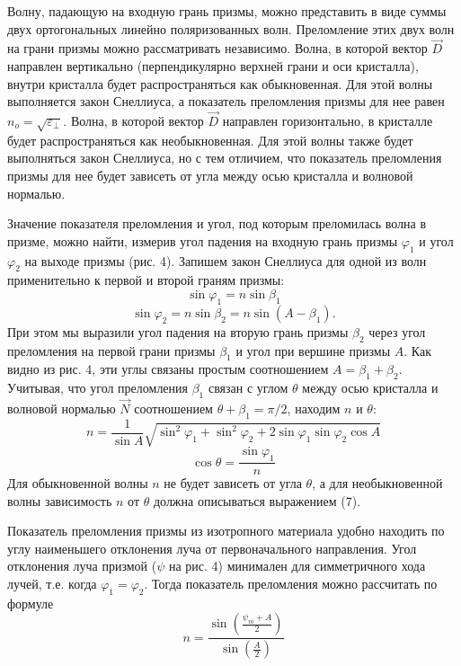 \documentclass[14pt]{article}
\begin{document}
Волну, падающую на входную грань
призмы, можно представить в виде
суммы двух ортогональных линейно
поляризованных волн. Преломление
этих двух волн на грани призмы можно
рассматривать независимо. Волна,
в которой вектор $\vec{D}$ направлен вертикально
(перпендикулярно верхней грани и оси кристалла), внутри кристалла
будет распространяться как обыкновенная.
Для этой волны выполняется
закон Снеллиуса, а показатель преломления
призмы для нее равен $n_o = \sqrt{\varepsilon_\perp}$. Волна, в которой вектор
$\vec{D}$ направлен горизонтально, в кристалле
будет распространяться
как необыкновенная.
Для этой волны также будет выполняться закон Снеллиуса, но
с тем отличием, что показатель преломления призмы для нее будет зависеть
от угла между осью кристалла и волновой нормалью.

Значение показателя преломления и угол, под которым преломилась
волна в призме, можно найти, измерив угол падения на входную грань
призмы $\varphi_1$ и угол $\varphi_2$ на выходе призмы (рис. 4). Запишем закон Снеллиуса
для одной из волн применительно к первой и второй граням призмы:
$$
	\sin\varphi_1 = n\sin\beta_1
$$
$$
	\sin\varphi_2 = n\sin\beta_2 = n\sin(A - \beta_1).
$$
\noindent При этом мы выразили угол падения на вторую грань призмы $\beta_2$ через
угол преломления на первой грани призмы $\beta_1$ и угол при вершине призмы
$A$. Как видно из рис. 4, эти углы связаны простым соотношением
$A = \beta_1 + \beta_2$. Учитывая, что угол преломления $\beta_1$ связан с углом $\theta$ между осью кристалла
и волновой нормалью $\vec{N}$ соотношением $\theta + \beta_1 = \pi/2$, находим $n$ и $\theta$:
\begin{equation}
	n = \frac{1}{\sin A}\sqrt{\sin^2\varphi_1 + \sin^2\varphi_2 + 2\sin\varphi_1\sin\varphi_2\cos A}
\end{equation}
$$
	\cos\theta = \frac{\sin\varphi_1}{n}
$$
\noindent Для обыкновенной волны
$n$ не будет зависеть от угла $\theta$, а для необыкновенной
волны зависимость $n$ от $\theta$ должна описываться выражением (7).

Показатель преломления призмы из изотропного материала удобно
находить по углу наименьшего отклонения луча от первоначального направления.
Угол отклонения луча призмой ($\psi$ на рис. 4) минимален для симметричного
хода лучей, т.е. когда $\varphi_1 = \varphi_2$. Тогда показатель преломления
можно рассчитать по формуле
\begin{equation}
	n = \frac{\sin\left(\frac{\psi_m + A}{2}\right)}{\sin\left(\frac{A}{2}\right)}
\end{equation}
\end{document}
